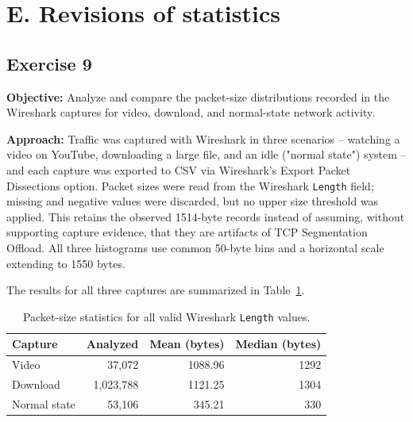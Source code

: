 \documentclass[12pt]{article}
\begin{document}
\section{E. Revisions of statistics}

\subsection{Exercise 9}

\textbf{Objective:} Analyze and compare the packet-size distributions recorded in the Wireshark captures for video, download, and normal-state network activity.

\textbf{Approach:} Traffic was captured with Wireshark in three scenarios -- watching a video on YouTube, downloading a large file, and an idle ("normal state") system -- and each capture was exported to CSV via Wireshark's Export Packet Dissections option. Packet sizes were read from the Wireshark \texttt{Length} field; missing and negative values were discarded, but no upper size threshold was applied. This retains the observed 1514-byte records instead of assuming, without supporting capture evidence, that they are artifacts of TCP Segmentation Offload. All three histograms use common 50-byte bins and a horizontal scale extending to 1550 bytes.


The results for all three captures are summarized in Table~\ref{tab:ex9_packet_sizes}.

\begin{table}[H]
\centering
\begin{tabular}{|l|r|r|r|}
\hline
Capture & Analyzed & Mean (bytes) & Median (bytes) \\
\hline
Video & 37,072 & 1088.96 & 1292 \\
\hline
Download & 1,023,788 & 1121.25 & 1304 \\
\hline
Normal state & 53,106 & 345.21 & 330 \\
\hline
\end{tabular}
\caption{Packet-size statistics for all valid Wireshark \texttt{Length} values.}
\label{tab:ex9_packet_sizes}
\end{table}
\end{document}
